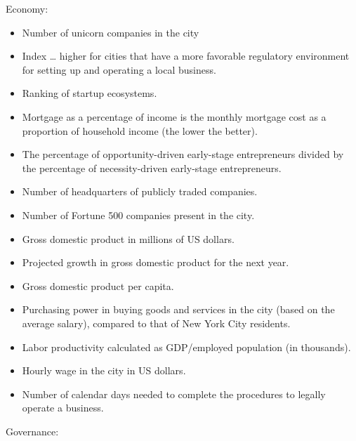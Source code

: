 \documentclass[
  english,
  12pt,
  a4paper,
]{scrartcl}
\providecommand{\tightlist}{%
  \setlength{\itemsep}{0pt}\setlength{\parskip}{0pt}}
\begin{document}
Economy:

\begin{itemize}
\tightlist
\item
  Number of unicorn companies in the city
\item
  Index \ldots{} higher for cities that have a more favorable regulatory
  environment for setting up and operating a local business.
\item
  Ranking of startup ecosystems.
\item
  Mortgage as a percentage of income is the monthly mortgage cost as a
  proportion of household income (the lower the better).
\item
  The percentage of opportunity-driven early-stage entrepreneurs divided
  by the percentage of necessity-driven early-stage entrepreneurs.
\item
  Number of headquarters of publicly traded companies.
\item
  Number of Fortune 500 companies present in the city.
\item
  Gross domestic product in millions of US dollars.
\item
  Projected growth in gross domestic product for the next year.
\item
  Gross domestic product per capita.
\item
  Purchasing power in buying goods and services in the city (based on
  the average salary), compared to that of New York City residents.
\item
  Labor productivity calculated as GDP/employed population (in
  thousands).
\item
  Hourly wage in the city in US dollars.
\item
  Number of calendar days needed to complete the procedures to legally
  operate a business.
\end{itemize}

Governance:
\end{document}
